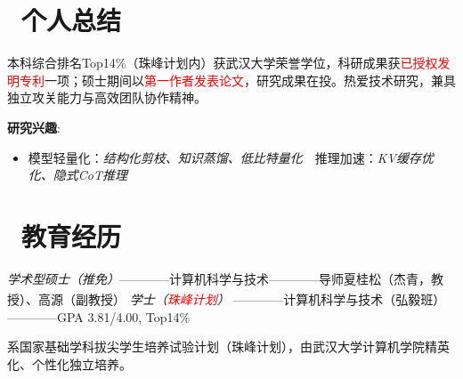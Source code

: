 \documentclass{resume}
\begin{document}
\section{\faUser\ 个人总结}
本科综合排名Top14\%（珠峰计划内）获武汉大学荣誉学位，科研成果获\textcolor{red}{已授权发明专利}一项；硕士期间以\textcolor{red}{第一作者发表论文}，研究成果在投。热爱技术研究，兼具独立攻关能力与高效团队协作精神。

\noindent
\textbf{研究兴趣}:
\begin{itemize}[nosep, leftmargin=*, topsep=0pt, partopsep=0pt]
      \item 模型轻量化：\textit{结构化剪枝、知识蒸馏、低比特量化}\ \ 推理加速：\textit{KV缓存优化、隐式CoT推理}
\end{itemize}

\vspace{-1mm}
\section{\faGraduationCap\ 教育经历}
\textit{学术型硕士（推免）}————计算机科学与技术————导师夏桂松（杰青，教授）、高源（副教授）
\vspace{-2mm}
\textit{学士（\textcolor{red}{珠峰计划}）} ————计算机科学与技术（弘毅班）\textsuperscript{\dag}————GPA 3.81/4.00, Top14\% 


{\footnotesize  \dag 系国家基础学科拔尖学生培养试验计划（珠峰计划），由武汉大学计算机学院精英化、个性化独立培养。​}
\end{document}

